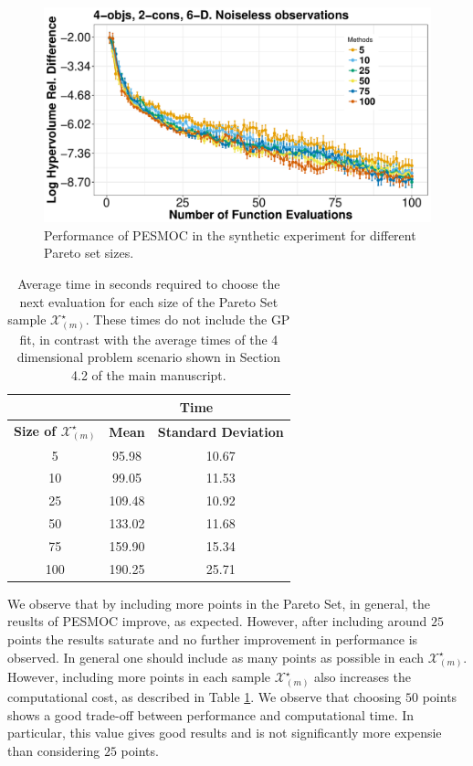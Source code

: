 \begin{figure}[htb]
        \begin{center}
        \includegraphics[width=0.75\linewidth]{../Figures/pesmoc/revision/plotParetoSensitivityAnalysis.pdf}
        \caption{Performance of PESMOC in the synthetic experiment for different Pareto set sizes.}
        \end{center}
\label{fig:PPP}
\end{figure}



\begin{table}[htb]
\centering
\caption{Average time in seconds required to choose
the next evaluation for each size of the Pareto Set sample $\mathcal{X}_{(m)}^\star$. These times do not include the GP fit, in contrast with the average times of the 4 dimensional problem scenario shown in Section 4.2 of the main manuscript.}
{\small
\begin{tabular}{c | c | c}
 \hline
 & \multicolumn{2}{c}{{\bf Time}} \\
 \hline
 {\bf Size of $\mathcal{X}_{(m)} ^\star$} & {\bf Mean} & {\bf Standard Deviation} \\
 \hline
 5 & 95.98& 10.67\\
 10 & 99.05& 11.53\\
 25 & 109.48& 10.92\\
 50 & 133.02& 11.68\\
 75 & 159.90& 15.34\\
 100 & 190.25& 25.71\\
 \hline
\end{tabular}
}
\label{table:times_size}
\end{table}


We observe that by including more points in the Pareto Set, in general, the reuslts of PESMOC improve, as expected.
However, after including around $25$ points the results saturate and no further improvement in performance is observed.
In general one should include as many points as possible in each $\mathcal{X}_{(m)}^\star$. However, including more points in each
sample $\mathcal{X}_{(m) }^\star$ also increases the computational cost, as described in Table \ref{table:times_size}. We observe that choosing $50$
points shows a good trade-off between performance and computational time. In particular, this value gives good results and
is not significantly more expensie than considering $25$ points.

